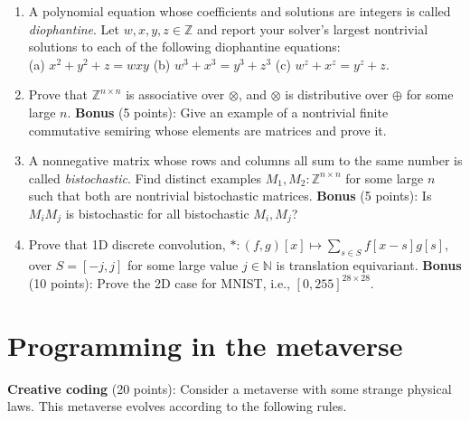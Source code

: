 \documentclass[11pt]{article}
\begin{document}
    \begin{enumerate}
        \item A polynomial equation whose coefficients and solutions are integers is called \textit{diophantine}. Let $w, x, y, z \in \mathbb{Z}$ and report your solver's largest nontrivial solutions to each of the following diophantine equations:\\ (a) $x^2+y^2+z = wxy$ (b) $w^3 + x^3 = y^3+z^3$ (c) $w^z + x^z = y^z + z$.
        \item Prove that $\mathbb{Z}^{n\times n}$ is associative over $\otimes$, and $\otimes$ is distributive over $\oplus$ for some large $n$. \textbf{Bonus} (5 points): Give an example of a nontrivial finite commutative semiring whose elements are matrices and prove it.
        \item A nonnegative matrix whose rows and columns all sum to the same number is called \textit{bistochastic}. Find distinct examples $M_1, M_2: \mathbb{Z}^{n\times n}$ for some large $n$ such that both are nontrivial bistochastic matrices. \textbf{Bonus} (5 points): Is $M_i M_j$ is bistochastic for all bistochastic $M_i, M_j$?
        \item Prove that 1D discrete convolution, $*: (f, g)[x] \mapsto \sum_{s \in S}f[x-s]g[s]$, over $S=[-j, j]$ for some large value $j \in \mathbb{N}$ is translation equivariant. \textbf{Bonus} (10 points): Prove the 2D case for MNIST, i.e., $[0, 255]^{28\times 28}$.
    \end{enumerate}\pagebreak

    \section {Programming in the metaverse}
    \textbf{Creative coding} (20 points): Consider a metaverse with some strange physical laws. This metaverse evolves according to the following rules.\\
\end{document}
